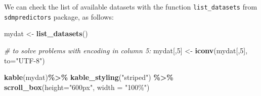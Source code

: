 \documentclass[
]{book}
\newenvironment{Shaded}{\begin{snugshade}}{\end{snugshade}}
\newcommand{\AttributeTok}[1]{\textcolor[rgb]{0.13,0.29,0.53}{#1}}
\newcommand{\CommentTok}[1]{\textcolor[rgb]{0.56,0.35,0.01}{\textit{#1}}}
\newcommand{\DecValTok}[1]{\textcolor[rgb]{0.00,0.00,0.81}{#1}}
\newcommand{\FunctionTok}[1]{\textcolor[rgb]{0.13,0.29,0.53}{\textbf{#1}}}
\newcommand{\NormalTok}[1]{#1}
\newcommand{\OtherTok}[1]{\textcolor[rgb]{0.56,0.35,0.01}{#1}}
\newcommand{\SpecialCharTok}[1]{\textcolor[rgb]{0.81,0.36,0.00}{\textbf{#1}}}
\newcommand{\StringTok}[1]{\textcolor[rgb]{0.31,0.60,0.02}{#1}}
\begin{document}
We can check the list of available datasets with the function \texttt{list\_datasets} from \texttt{sdmpredictors} package, as follows:

\begin{Shaded}
\begin{Highlighting}[]
\NormalTok{mydat }\OtherTok{\textless{}{-}} \FunctionTok{list\_datasets}\NormalTok{()}

\CommentTok{\# to solve problems with encoding in column 5:}
\NormalTok{mydat[,}\DecValTok{5}\NormalTok{] }\OtherTok{\textless{}{-}} \FunctionTok{iconv}\NormalTok{(mydat[,}\DecValTok{5}\NormalTok{], }\AttributeTok{to=}\StringTok{"UTF{-}8"}\NormalTok{)}

\FunctionTok{kable}\NormalTok{(mydat)}\SpecialCharTok{\%\textgreater{}\%} 
  \FunctionTok{kable\_styling}\NormalTok{(}\StringTok{"striped"}\NormalTok{) }\SpecialCharTok{\%\textgreater{}\%} 
  \FunctionTok{scroll\_box}\NormalTok{(}\AttributeTok{height=}\StringTok{"600px"}\NormalTok{, }\AttributeTok{width =} \StringTok{"100\%"}\NormalTok{)}
\end{Highlighting}
\end{Shaded}
\end{document}
